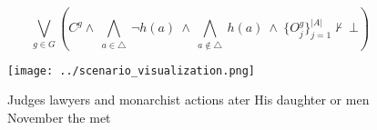\documentclass[a4paper]{article}
\begin{document}
\[\bigvee_{g\in G} (C^g \wedge\ \bigwedge_{a\in \triangle}\ \neg h(a)\ \wedge\ \bigwedge_{a\notin \triangle}\ h(a)\ \wedge\ \{O_j^g\}_{j=1}^{|A|} \nvdash\ \bot )\]

\begin{figure}
\centering
\texttt{[image: ../scenario\_visualization.png]}
\caption{Judges lawyers and monarchist actions ater His daughter or men November the met
}
\end{figure}
 
\end{document}
